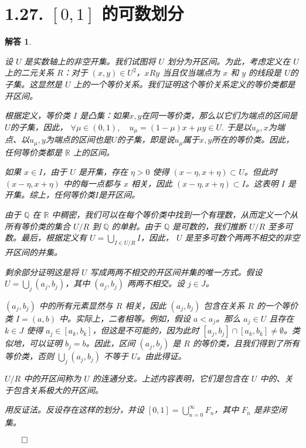 \documentclass[12pt,UTF8]{ctexbook}
\theoremstyle{exercisestyle}
\theoremstyle{solutionstyle}
\newtheorem*{solution*}{解答}
\newenvironment{solution}
  {\begin{solution*}}
  {\hfill\ensuremath{\qed}\end{solution*}}
\begin{document}
\section{1.27. $[0,1]$ 的可数划分}
\begin{solution}
  \begin{subquestions}
    \item 设 \( U \) 是实数轴上的非空开集。我们试图将 \( U \) 划分为开区间。为此，考虑定义在 \( U \) 上的二元关系 \( R \)：对于 \((x, y) \in U^2\)，\( x R y \) 当且仅当端点为 \( x \) 和 \( y \) 的线段是 \( U \)的子集。这显然是 \( U \) 上的一个等价关系。我们证明这个等价关系定义的等价类都是开区间。
    
    根据定义，等价类 \( I \) 是凸集：如果$x, y$在同一等价类，那么以它们为端点的区间是$U$的子集，因此，
    $\forall \mu\in(0,1), \quad u_{\mu}  = (1 - \mu)x + \mu y \in U. $
    于是以$u_{\mu},x$为端点、以$u_{\mu},y$为端点的区间也是$U$的子集，即是说$u_{\mu}$属于$x,y$所在的等价类。因此，任何等价类都是 \( \mathbb{R} \) 上的区间。
    
    如果 \( x \in I \)，由于 \( U \) 是开集，存在 \( \eta > 0 \) 使得 \((x - \eta, x + \eta) \subset U\)。但此时 \((x - \eta, x + \eta)\) 中的每一点都与 \( x \) 相关，因此 \((x - \eta, x + \eta) \subset I\)。这表明 \( I \) 是开集。综上，任何等价类$I$是开区间。
    
    由于 \( \mathbb{Q} \) 在 \( \mathbb{R} \) 中稠密，我们可以在每个等价类中找到一个有理数，从而定义一个从所有等价类的集合 \( U/R \) 到 \( \mathbb{Q} \) 的单射。由于 \( \mathbb{Q} \) 是可数的，我们推断 \( U/R \) 至多可数。最后，根据定义有 \( U = \bigcup_{I \in U/R} I \)，因此， \( U \) 是至多可数个两两不相交的非空开区间的并集。

    剩余部分证明这是将 \( U \) 写成两两不相交的开区间并集的唯一方式。假设 \( U = \bigcup_j (a_j, b_j) \)，其中 \((a_j, b_j)\) 两两不相交。设 \( j \in J \)。

    \((a_j, b_j)\) 中的所有元素显然与 \( R \) 相关，因此 \((a_j, b_j)\) 包含在关系 \( R \) 的一个等价类 \( I = (a, b) \) 中。实际上，二者相等。例如，假设 \( a < a_j \)。那么 \( a_j \in U \) 且存在 \( k \in J \) 使得 \( a_j \in [a_k, b_k] \)，但这是不可能的，因为此时 \([a_j, b_j] \cap [a_k, b_k] \neq \emptyset\)。类似地，可以证明 \( b_j = b \)。因此，区间 \((a_j, b_j)\) 是 \( R \) 的等价类，且我们得到了所有等价类，否则 \(\bigcup_j (a_j, b_j)\) 不等于 \( U \)。由此得证。

    \( U/R \) 中的开区间称为 \( U \) 的连通分支。上述内容表明，它们是包含在 \( U \) 中的、关于包含关系极大的开区间。
    \item 用反证法。反设存在这样的划分，并设 \([0,1] = \bigcup_{n=0}^{\infty} F_n\)，其中 \( F_n \) 是非空闭集。


\end{subquestions}
\end{solution}
\end{document}
